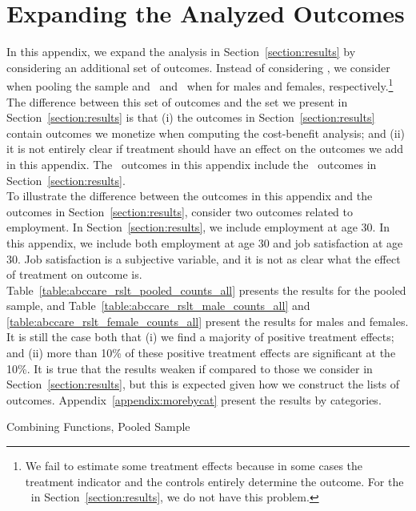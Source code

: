 \section{{Expanding the Analyzed Outcomes}} \label{appendix:moreoutcomes}

\noindent In this appendix, we expand the analysis in Section~\ref{section:results} by considering an additional set of outcomes. Instead of considering \noutcomes, we consider \noutcomesexpp when pooling the sample and \noutcomesexpm\ and \noutcomesexpf\ when for males and females, respectively.\footnote{We fail to estimate some treatment effects because in some cases the treatment indicator and the controls entirely determine the outcome. For the \noutcomes\ in Section~\ref{section:results}, we do not have this problem.} The difference between this set of outcomes and the set we present in Section~\ref{section:results} is that (i) the outcomes in Section~\ref{section:results} contain outcomes we monetize when computing the cost-benefit analysis; and (ii) it is not entirely clear if treatment should have an effect on the outcomes we add in this appendix. The \noutcomes\ outcomes in this appendix include the \noutcomes\ outcomes in Section~\ref{section:results}.\\

\noindent To illustrate the difference between the outcomes in this appendix and the outcomes in Section~\ref{section:results}, consider two outcomes related to employment. In Section~\ref{section:results}, we include employment at age 30. In this appendix, we include both employment at age 30 and job satisfaction at age 30. Job satisfaction is a subjective variable, and it is not as clear what the effect of treatment on outcome is.\\

\noindent Table~\ref{table:abccare_rslt_pooled_counts_all} presents the results for the pooled sample, and Table~\ref{table:abccare_rslt_male_counts_all} and \ref{table:abccare_rslt_female_counts_all} present the results for males and females. It is still the case both that (i) we find a majority of positive treatment effects; and (ii) more than 10\% of these positive treatment effects are significant at the 10\%. It is true that the results weaken if compared to those we consider in Section~\ref{section:results}, but this is expected given how we construct the lists of outcomes. Appendix~\ref{appendix:morebycat} present the results by categories.

	\begin{table}[H]
     \caption{Combining Functions, Pooled Sample} 
     \label{table:abccare_rslt_pooled_counts_all}
	
	\end{table}  

